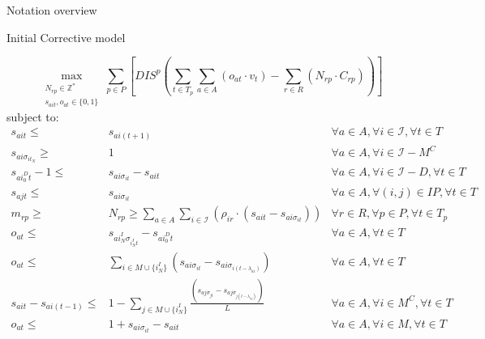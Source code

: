\documentclass{beamer}
\begin{document}
\begin{frame}{Notation overview}
\end{frame}


\begin{frame}{Initial Corrective model}
\scriptsize

\begin{equation}
	\max_{\substack{N_{rp} \in \mathbb{Z}^* \\ 
	s_{ait}, o_{at} \in \{0, 1\}}} 
	\sum_{p \in P} [ DIS^p (\sum_{t\in T_p} \sum_{a \in A} (o_{at} \cdot v_t)  - \sum_{r\in R} (N_{rp} \cdot C_{rp})) ]
\end{equation}
subject to:
\begin{align}
s_{ait} \leq& s_{ai(t+1)}															& \forall a \in A, \forall i \in \mathcal{I}, \forall t \in T		\\
s_{ai\sigma_{it_N}} \geq& 1														& \forall a \in A, \forall i \in \mathcal{I} - M^C			\\
s_{ai^D_0t} - 1 \leq& s_{ai\sigma_{it}} - s_{ait}											& \forall a \in A, \forall i \in \mathcal{I} - D, \forall t \in T	\\
s_{ajt} \leq& s_{ai\sigma_{it}}														& \forall a \in A, \forall (i, j) \in IP, \forall t \in T 		\\
m_{rp} \geq& N_{rp} \geq \sum_{a\in A} \sum_{i\in \mathcal{I}} (\rho_{ir} \cdot (s_{ait} - s_{ai\sigma_{it}})) 		& \forall r \in R, \forall p \in P, \forall t \in T_p 			\\
o_{at} \leq& s_{ai^I_N\sigma_{i^I_Nt}} - s_{ai^D_0t}										& \forall a \in A, \forall t \in T					\\
o_{at} \leq& \sum_{i \in M \cup \{i^I_N\}} (s_{ai\sigma_{it}} - s_{ai\sigma_{i(t-\lambda_{ai})}})				& \forall a \in A, \forall t \in T					\\
s_{ait} - s_{ai(t-1)} \leq& 1 - \sum_{j \in M \cup \{i^I_N\}} \frac{(s_{aj\sigma_{jt}} - s_{aj\sigma_{j(t-\lambda_{aj})}})}{L}		& \forall a \in A, \forall i \in M^C, \forall t \in T 	\\
o_{at} \leq& 1 + s_{ai\sigma_{it}} - s_{ait}												& \forall a \in A, \forall i \in M, \forall t \in T		
\end{align}

\end{frame}
\end{document}
